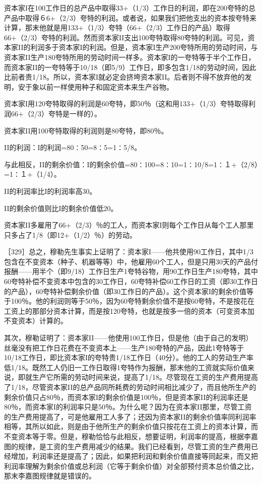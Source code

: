 资本家I在100工作日的总产品中取得33+（1/3）工作日的利润，即在200夸特的总产品中取得６6+（2/3）夸特的利润。或者说，如果我们把他支出的资本按夸特来计算，那末他就是用133+（1/3）夸特（66+（2/3）工作日的产品）取得66+（2/3）夸特的利润。然而资本家II支出100夸特取得80夸特的利润。可见，资本家II的利润多于资本家I的利润。但是，资本家I生产200夸特所用的劳动时间，与资本家II生产180夸特所用的劳动时间一样多。资本家I的一夸特等于半个工作日，而资本家II的一夸特等于10/18（即5/9）工作日，即多包含1/18的劳动时间，因此比前者贵1/18。所以，资本家I就必定会挤垮资本家II。后者则不得不放弃他的发明，安于象以前一样使用种子和固定资本来生产谷物。

资本家I用120夸特取得的利润是60夸特，即50％（这和用133+（1/3）夸特取得利润66+（2/3）夸特是一样的）。

资本家II用100夸特取得的利润则是80夸特，即80％。

II的利润：I的利润=80∶50=8∶5=1∶5/8。

与此相反，II的剩余价值：I的剩余价值=80∶100=8∶10=1∶10/8=1∶１+（2/8）=1∶１+（1/4）。

II的利润率比I的利润率高30。

II的剩余价值则比I的剩余价值低20。

资本家II多雇用了66+（2/3）％的工人，而资本家I则每个工作日从每个工人那里只多占了1/8（即12+（1/2）％）的劳动。

［329］总之，穆勒先生事实上证明了：资本家I——他共使用90工作日，其中1/3包含在不变资本（种子、机器等等）中，他雇用60个工人，但是只用30天的产品付报酬——用半个（即9/18）工作日生产1夸特谷物，用90工作日生产180夸特，其中60夸特补偿不变资本中包含的30工作日，60夸特补偿60工作日的工资（即30工作日的产品），60夸特补偿剩余价值（即30工作日的产品）。这个资本家I的剩余价值等于100％。他的利润则等于50％，因为60夸特剩余价值不是按60夸特，不是按花在工资上的那部分资本计算，而是按120夸特，也就是按多一倍的资本（可变资本加不变资本）计算的。

其次，穆勒证明了：资本家II——他使用100工作日，但是他（由于自己的发明）丝毫没有把工作日花费在不变资本上——生产180夸特的产品，因此1夸特等于10/18工作日，即比资本家I的夸特贵1/18工作日（40分）。他的工人的劳动生产率低1/18。既然工人仍旧一工作日取得1夸特作为报酬，那末他的工资就实际价值来说，即就生产它所需的劳动时间来说，提高了1/18。尽管现在工资的生产费用提高了1/18，尽管资本家II的总产品同所耗费的劳动时间相比减少了，而且他所生产的剩余价值只占80％，而资本家I的剩余价值是100％，但是资本家II的利润率还是80％，而资本家I的利润率只是50％。为什么呢？因为在资本家II那里，尽管工资的生产费用提高了，可是他雇用工人多了；还因为资本家II的剩余价值率同利润率相等，其所以如此，则是由于他所生产的剩余价值只按花在工资上的资本计算，而不变资本等于零。但是，穆勒恰恰与此相反，想要证明，利润率的提高，根据李嘉图的规律，是工资的生产费用减少的结果。我们已经看到，尽管工资的生产费用已经增加，利润率还是提高了；因此，如果把利润和剩余价值直接等同起来，而又把利润率理解为剩余价值或总利润（它等于剩余价值）对全部预付资本总价值之比，那末李嘉图规律就是错误的。

